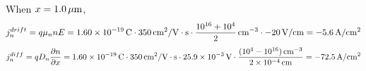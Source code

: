 \documentclass{article}
\newcommand{\unit}[1]{{\rm\,#1}}
\begin{document}
When $x=1.0\unit{\mu m}$,
$$j_n^{drift}=q\mu_nnE=1.60\times10^{-19}\unit{C}\cdot350\unit{cm^2/V\cdot s}\cdot\frac{10^{16}+10^4}{2}\unit{cm^{-3}}\cdot-20\unit{V/cm}=-5.6\unit{A/cm^2}$$
$$j_n^{diff}=qD_n\frac{\partial n}{\partial x}=1.60\times10^{-19}\unit{C}\cdot350\unit{cm^2/V\cdot s}\cdot25.9\times10^{-3}\unit{V}\cdot\frac{(10^4-10^{16})\unit{cm^{-3}}}{2\times10^{-4}\unit{cm}}=-72.5\unit{A/cm^2}$$
\end{document}
